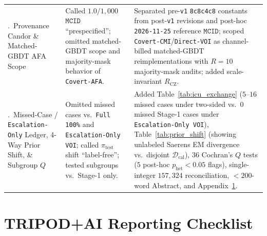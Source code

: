 \documentclass[11pt]{article}
\theoremstyle{remark}
\begin{document}
\begin{table}[h!]
\begin{tabular}{>{\raggedright\arraybackslash}p{}>{\raggedright\arraybackslash}p{}>{\raggedright\arraybackslash}p{}}
4.\ Provenance Candor \& Matched-GBDT AFA Scope & Called $1.0/1{,}000$ $\texttt{MCID}$ ``prespecified''; omitted matched-GBDT scope and majority-mask behavior of \texttt{Covert-AFA}. & Separated pre-\texttt{v1} \texttt{8c8c4c8} constants from post-\texttt{v1} revisions and post-hoc \texttt{2026-11-25} reference $\texttt{MCID}$; scoped \texttt{Covert-CMI}/\texttt{Direct-VOI} as channel-billed matched-GBDT reimplementations with $R=10$ majority-mask audits; added scale-invariant $R_{\text{CZ}}$. \\
5.\ Missed-Case / \texttt{Escalation-Only} Ledger, 4-Way Prior Shift, \& Subgroup $Q$ & Omitted missed cases vs.\ \texttt{Full 100\%} and \texttt{Escalation-Only VOI}; called $\pi_{\text{test}}$ shift ``label-free''; tested subgroups vs.\ Stage-1 only. & Added Table~\ref{tab:icu_exchange} ($5\text{--}16$ missed cases under two-sided vs.\ $0$ missed Stage-1 cases under \texttt{Escalation-Only VOI}), Table~\ref{tab:prior_shift} (showing unlabeled Saerens EM divergence vs.\ disjoint $\mathcal{D}_{\text{cal}}$), $36$ Cochran's $Q$ tests ($5$ post-hoc $p_{\text{het}}<0.05$ flags), single-integer $157{,}324$ reconciliation, $<200$-word Abstract, and Appendix~\ref{app:tripod}. \\
\bottomrule
\end{tabular}
\end{table}

\section{TRIPOD+AI Reporting Checklist}
\label{app:tripod}



\clearpage


\end{document}
